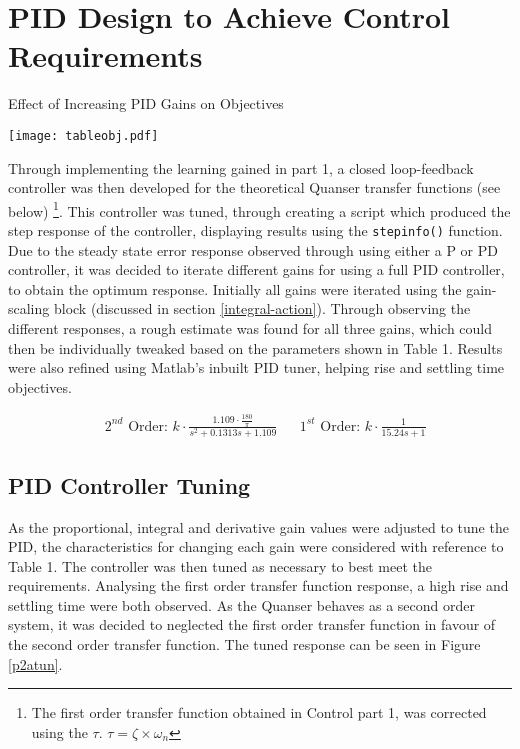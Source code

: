 \section{PID Design to Achieve Control
Requirements}\label{pid-design-to-achieve-control-requirements}

\begin{wraptable}{r}{0.5\textwidth}
\vspace{-20pt}
\caption{Effect of Increasing PID Gains on Objectives}
\vspace{-5pt}
\centering
 \texttt{[image: tableobj.pdf]}
 \vspace{-20pt}
 \label{paramtab}
\end{wraptable}

Through implementing the learning gained in part 1, a closed
loop-feedback controller was then developed for the theoretical Quanser
transfer functions (see below)
\footnote{The first order transfer function obtained in Control part 1, was corrected using the $\tau$. $\tau = \zeta \times \omega_n$}.
This controller was tuned, through creating a script which produced the
step response of the controller, displaying results using the
\texttt{stepinfo()} function. Due to the steady state error response
observed through using either a P or PD controller, it was decided to
iterate different gains for using a full PID controller, to obtain the
optimum response. Initially all gains were iterated using the
gain-scaling block (discussed in section \ref{integral-action}). Through
observing the different responses, a rough estimate was found for all
three gains, which could then be individually tweaked based on the
parameters shown in Table 1. Results were also refined using Matlab's
inbuilt PID tuner, helping rise and settling time objectives.

\begin{align*}
&\text{$2^{nd}$ Order: }k \cdot \frac { 1.109\cdot \frac{180} {\pi} }{ s^2 + 0.1313s +1.109 }
&&\text{$1^{st}$ Order: }k \cdot \frac { 1 }{ 15.24s +1 }
\end{align*}

\subsection{PID Controller Tuning}\label{pid-controller-tuning}

As the proportional, integral and derivative gain values were adjusted
to tune the PID, the characteristics for changing each gain were
considered with reference to Table 1. The controller was then tuned as
necessary to best meet the requirements. Analysing the first order
transfer function response, a high rise and settling time were both
observed. As the Quanser behaves as a second order system, it was
decided to neglected the first order transfer function in favour of the
second order transfer function. The tuned response can be seen in Figure
\ref{p2atun}.

